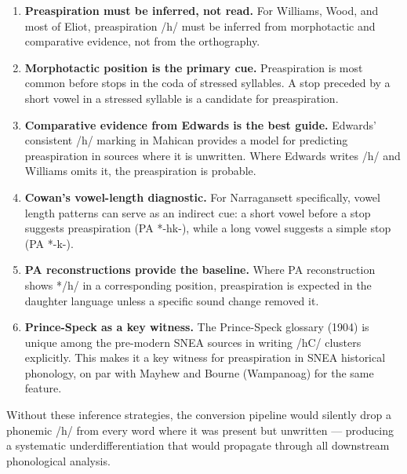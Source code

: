 \begin{enumerate}
  \item \textbf{Preaspiration must be inferred, not read.} For Williams, Wood,
    and most of Eliot, preaspiration /h/ must be inferred from morphotactic
    and comparative evidence, not from the orthography.

  \item \textbf{Morphotactic position is the primary cue.} Preaspiration is
    most common before stops in the coda of stressed syllables. A
    stop preceded by a short vowel in a stressed syllable is a candidate for
    preaspiration.

  \item \textbf{Comparative evidence from Edwards is the best guide.}
    Edwards' consistent /h/ marking in Mahican provides a model for
    predicting preaspiration in sources where it is unwritten. Where Edwards
    writes /h/ and Williams omits it, the preaspiration is probable.

  \item \textbf{Cowan's vowel-length diagnostic.} For Narragansett
    specifically, vowel length patterns can serve as an indirect cue: a short
    vowel before a stop suggests preaspiration (PA *-hk-), while a long vowel
    suggests a simple stop (PA *-k-).

  \item \textbf{PA reconstructions provide the baseline.} Where PA
    reconstruction shows */h/ in a corresponding position, preaspiration is
    expected in the daughter language unless a specific sound change removed
    it.

  \item \textbf{Prince-Speck as a key witness.} The Prince-Speck glossary
    (1904) is unique among the pre-modern SNEA sources in writing /hC/
    clusters explicitly. This makes it a key witness for preaspiration in
    SNEA historical phonology, on par with Mayhew and Bourne (Wampanoag) for
    the same feature.
\end{enumerate}

Without these inference strategies, the conversion pipeline would silently
drop a phonemic /h/ from every word where it was present but unwritten ---
producing a systematic underdifferentiation that would propagate through all
downstream phonological analysis.
